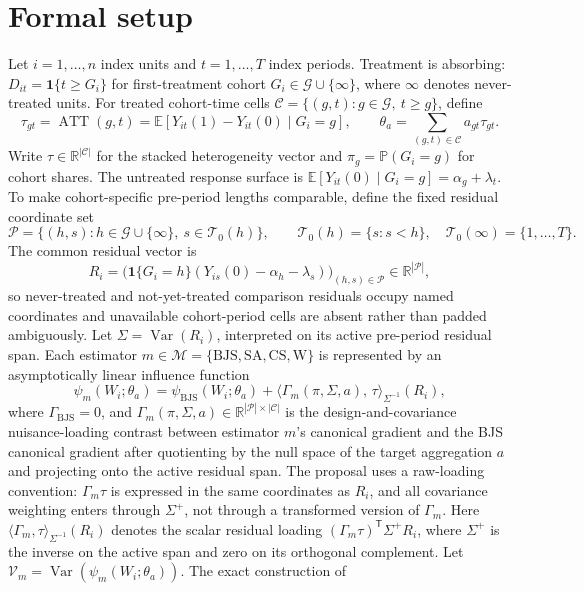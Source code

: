 \documentclass[11pt]{article}
\newcommand{\E}{\mathbb{E}}
\renewcommand{\Pr}{\mathbb{P}}
\newcommand{\one}{\mathbf{1}}
\newcommand{\transpose}{\mathsf{T}}
\newcommand{\R}{\mathbb{R}}
\theoremstyle{definition}
\theoremstyle{plain}
\theoremstyle{remark}
\begin{document}
\section{Formal setup}
Let \(i=1,\ldots,n\) index units and \(t=1,\ldots,T\) index periods.  Treatment is absorbing:
\(D_{it}=\one\{t\ge G_i\}\) for first-treatment cohort \(G_i\in\mathcal G\cup\{\infty\}\), where
\(\infty\) denotes never-treated units.  For treated cohort-time cells
\(\mathcal C=\{(g,t):g\in\mathcal G,\ t\ge g\}\), define
\[
  \tau_{gt}=\operatorname{ATT}(g,t)=\E[Y_{it}(1)-Y_{it}(0)\mid G_i=g],
  \qquad
  \theta_a=\sum_{(g,t)\in\mathcal C}a_{gt}\tau_{gt}.
\]
Write \(\tau\in\R^{|\mathcal C|}\) for the stacked heterogeneity vector and
\(\pi_g=\Pr(G_i=g)\) for cohort shares.  The untreated response surface is
\(\E[Y_{it}(0)\mid G_i=g]=\alpha_g+\lambda_t\).  To make cohort-specific pre-period lengths
comparable, define the fixed residual coordinate set
\[
  \mathcal P=\{(h,s):h\in\mathcal G\cup\{\infty\},\ s\in\mathcal T_0(h)\},
  \qquad
  \mathcal T_0(h)=\{s:s<h\},\quad
  \mathcal T_0(\infty)=\{1,\ldots,T\}.
\]
The common residual vector is
\[
  R_i=\bigl(\one\{G_i=h\}(Y_{is}(0)-\alpha_h-\lambda_s)\bigr)_{(h,s)\in\mathcal P}
  \in\R^{|\mathcal P|},
\]
so never-treated and not-yet-treated comparison residuals occupy named coordinates and unavailable
cohort-period cells are absent rather than padded ambiguously.  Let
\(\Sigma=\operatorname{Var}(R_i)\), interpreted on its active pre-period residual span.  Each estimator
\(m\in\mathcal M=\{\mathrm{BJS},\mathrm{SA},\mathrm{CS},\mathrm{W}\}\) is represented by an
asymptotically linear influence function
\[
  \psi_m(W_i;\theta_a)
    = \psi_{\mathrm{BJS}}(W_i;\theta_a)
      + \langle \Gamma_m(\pi,\Sigma,a),\,\tau\rangle_{\Sigma^{-1}}(R_i),
\]
where \(\Gamma_{\mathrm{BJS}}=0\), and
\(\Gamma_m(\pi,\Sigma,a)\in\R^{|\mathcal P|\times|\mathcal C|}\) is the design-and-covariance
nuisance-loading contrast between estimator \(m\)'s canonical gradient and the BJS canonical gradient
after quotienting
by the null space of the target aggregation \(a\) and projecting onto the active residual span.  The
proposal uses a raw-loading convention: \(\Gamma_m\tau\) is expressed in the same coordinates as
\(R_i\), and all covariance weighting enters through \(\Sigma^{+}\), not through a transformed
version of \(\Gamma_m\).  Here
\(\langle \Gamma_m,\tau\rangle_{\Sigma^{-1}}(R_i)\) denotes the scalar residual loading
\((\Gamma_m\tau)^\transpose \Sigma^{+}R_i\), where \(\Sigma^{+}\) is the inverse on the active span
and zero on its orthogonal complement.  Let
\(\mathcal V_m=\operatorname{Var}(\psi_m(W_i;\theta_a))\).  The exact construction of
\end{document}
